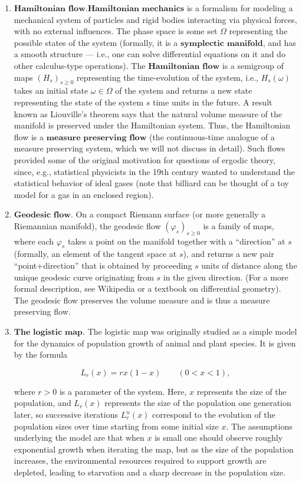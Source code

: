 \begin{enumerate}[label=\arabic*.]
\item $\textbf{Hamiltonian flow.}$$\textbf{Hamiltonian mechanics}$ is a formalism for
modeling a mechanical system of particles and rigid
bodies interacting via physical forces, with no
external influences. The phase space is some set
$\Omega$ representing the possible states of the
system (formally, it is a
$\textbf{symplectic manifold}$, and has a smooth
structure --- i.e.,  one can solve differential
equations on it and do other calculus-type
operations). The $\textbf{Hamiltonian flow}$ is a
semigroup of maps $(H_s)_{s\ge 0}$ representing the
time-evolution of the system, i.e., $H_s(\omega)$
takes an initial state $\omega\in\Omega$ of the
system and returns a new state representing the state
of the system $s$ time units in the future. A result
known as Liouville's theorem says that the natural
volume measure of the manifold is preserved under the
Hamiltonian system. Thus, the Hamiltonian flow is a
$\textbf{measure preserving flow}$ (the
continuous-time analogue of a measure preserving
system, which we will not discuss in detail). Such
flows provided some of the original motivation for
questions of ergodic theory, since, e.g., statistical
physicists in the 19th century wanted to understand
the statistical behavior of ideal gases (note that
billiard can be thought of a toy model for a gas in an
enclosed region).

\item $\textbf{Geodesic flow.}$ On a compact Riemann
surface (or more generally a Riemannian manifold), the
geodesic flow $(\varphi_s)_{s\ge0}$ is a family of
maps, where each $\varphi_s$ takes a point on the
manifold together with a ``direction'' at $s$
(formally, an element of the tangent space at $s$),
and returns a new pair ``point+direction'' that is
obtained by proceeding $s$ units of distance along
the unique geodesic curve originating from $s$ in the
given direction. (For a more formal description, see
Wikipedia or a textbook on differential geometry). The
geodesic flow preserves the volume measure and is thus
a measure preserving flow.

\item $\textbf{The logistic map.}$ The logistic map was
originally studied as a simple model for the dynamics
of population growth of animal and plant species. It
is given by the formula

\[
L_r(x) = rx(1-x) \qquad (0<x<1),
\]

\noindent where $r>0$ is a parameter of the system. Here, $x$
represents the size of the population, and $L_r(x)$
represents the size of the population one generation
later, so successive iterations $L_r^{n}(x)$
correspond to the evolution of the population sizes
over time starting from some initial size $x$. The
assumptions underlying the model are that when $x$ is
small one should observe roughly exponential growth
when iterating the map, but as the size of the
population increases, the environmental resources
required to support growth are depleted, leading to
starvation and a sharp decrease in the population
size.


\end{enumerate}
